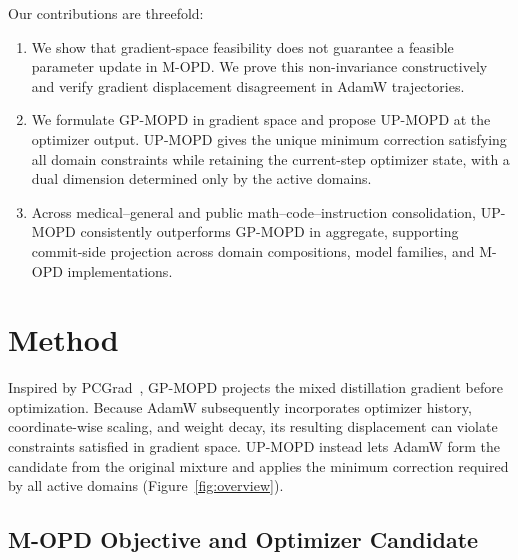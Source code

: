 \documentclass{article}
\begin{document}
Our contributions are threefold:
\begin{enumerate}
   

    \item We show that gradient-space feasibility does not guarantee a feasible parameter update in M-OPD. We prove this non-invariance constructively and verify gradient displacement disagreement in AdamW trajectories.

    \item We formulate GP-MOPD in gradient space and propose UP-MOPD at the optimizer output. UP-MOPD gives the unique minimum correction satisfying all domain constraints while retaining the current-step optimizer state, with a dual dimension determined only by the active domains.

    \item Across medical--general and public math--code--instruction consolidation, UP-MOPD consistently outperforms GP-MOPD in aggregate, supporting commit-side projection across domain compositions, model families, and M-OPD implementations.

    
\end{enumerate}

\section{Method}

Inspired by PCGrad~\citep{ref26}, GP-MOPD projects the mixed distillation
gradient before optimization. Because AdamW subsequently incorporates
optimizer history, coordinate-wise scaling, and weight decay, its resulting
displacement can violate constraints satisfied in gradient space. UP-MOPD
instead lets AdamW form the candidate from the original mixture and applies
the minimum correction required by all active domains
(Figure~\ref{fig:overview}).

\subsection{M-OPD Objective and Optimizer Candidate}
\end{document}
